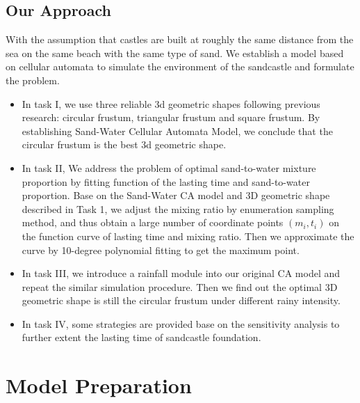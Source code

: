 \documentclass{mcmthesis}		    %
\begin{document}
	\subsection{Our Approach}
	With the assumption that castles are built at roughly the same distance from the sea on the same beach with the same type of sand. We establish a model based on cellular automata to simulate the environment of the sandcastle and formulate the problem. 
	\begin{itemize}
	
	\item In task I, we use three reliable 3d geometric shapes following previous research\cite{pakpour2012construct}: circular frustum, triangular frustum and square frustum. By establishing Sand-Water Cellular Automata Model, we conclude that the circular frustum is the best 3d geometric shape.
	
	\item In task II, We address the problem of optimal sand-to-water mixture proportion by fitting  function of the lasting time and sand-to-water proportion. Base on the Sand-Water CA model and 3D geometric shape described in Task 1, we adjust the mixing ratio by enumeration sampling method, and thus obtain a large number of coordinate points $(m_i,t_i)$ on the function curve of lasting time and mixing ratio. Then we approximate the curve by 10-degree polynomial fitting to get the maximum point.
	
	\item In task III, we introduce a rainfall module into our original CA model and repeat the similar simulation procedure. Then we find out the optimal 3D geometric shape is still the circular frustum under different rainy intensity.
	
	\item In task IV, some strategies are provided base on the sensitivity analysis to further extent the lasting time of sandcastle foundation.
	
	
	\end{itemize}
	
	\section{Model Preparation}
	
\end{document}
